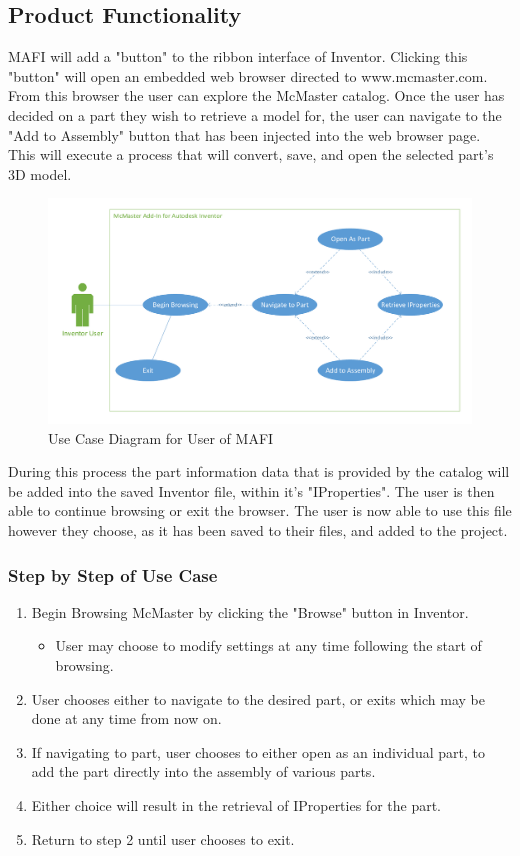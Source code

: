 \documentclass[12pt, letterpaper]{article}
\begin{document}
\subsection{Product Functionality}
MAFI will add a "button" to the ribbon interface of Inventor. Clicking this "button" will open an embedded web browser directed to www.mcmaster.com. 
From this browser the user can explore the McMaster catalog. Once the user has decided on a part they wish to retrieve a model for, the user can navigate 
to the "Add to Assembly" button that has been injected into the web browser page. This will execute a process that will convert, save, and open the selected
part's 3D model. 
\begin{figure}[H]
    \begin{center}
        \includegraphics[width=1\textwidth]{Figures/Use_Case_Diagram.pdf}
    \end{center}
    \caption{Use Case Diagram for User of MAFI}
\end{figure}

During this process the part information data that is provided by the catalog will be added into the saved Inventor file, within it's "IProperties".
 The user is then able to continue browsing or exit the browser. The user is now able to use this file however they choose, as it has been saved to their files, and added to the project.
\subsubsection{Step by Step of Use Case}
\begin{enumerate}
    \item Begin Browsing McMaster by clicking the "Browse" button in Inventor.
    \begin{itemize}
    \item User may choose to modify settings at any time following the start of browsing.
    \end{itemize}
    \item User chooses either to navigate to the desired part, or exits which may be done at any time from now on.
    \item If navigating to part, user chooses to either open as an individual part, to add the part directly into the assembly of various parts.
    \item Either choice will result in the retrieval of IProperties for the part.
    \item Return to step 2 until user chooses to exit.
\end{enumerate}
\end{document}
